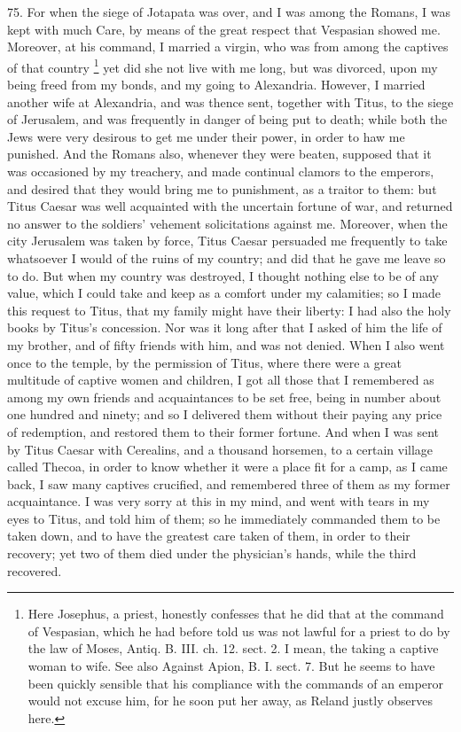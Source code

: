75. For when the siege of Jotapata was over, and I was among the Romans, I
was kept with much Care, by means of the great respect that Vespasian
showed me. Moreover, at his command, I married a virgin, who was from
among the captives of that country \footnote{Here Josephus, a priest,
honestly confesses that he did that at the command of Vespasian, which he
had before told us was not lawful for a priest to do by the law of Moses,
Antiq. B. III. ch. 12. sect. 2. I mean, the taking a captive woman to
wife. See also Against Apion, B. I. sect. 7. But he seems to have been
quickly sensible that his compliance with the commands of an emperor would
not excuse him, for he soon put her away, as Reland justly observes here.} yet did
she not live with me long, but was divorced, upon my being freed from my
bonds, and my going to Alexandria. However, I married another wife at
Alexandria, and was thence sent, together with Titus, to the siege of
Jerusalem, and was frequently in danger of being put to death; while both
the Jews were very desirous to get me under their power, in order to haw
me punished. And the Romans also, whenever they were beaten, supposed that
it was occasioned by my treachery, and made continual clamors to the
emperors, and desired that they would bring me to punishment, as a traitor
to them: but Titus Caesar was well acquainted with the uncertain fortune
of war, and returned no answer to the soldiers' vehement solicitations
against me. Moreover, when the city Jerusalem was taken by force, Titus
Caesar persuaded me frequently to take whatsoever I would of the ruins of
my country; and did that he gave me leave so to do. But when my country
was destroyed, I thought nothing else to be of any value, which I could
take and keep as a comfort under my calamities; so I made this request to
Titus, that my family might have their liberty: I had also the holy books
by Titus's concession. Nor was it long after that I asked of him the life
of my brother, and of fifty friends with him, and was not denied. When I
also went once to the temple, by the permission of Titus, where there were
a great multitude of captive women and children, I got all those that I
remembered as among my own friends and acquaintances to be set free, being
in number about one hundred and ninety; and so I delivered them without
their paying any price of redemption, and restored them to their former
fortune. And when I was sent by Titus Caesar with Cerealins, and a
thousand horsemen, to a certain village called Thecoa, in order to know
whether it were a place fit for a camp, as I came back, I saw many
captives crucified, and remembered three of them as my former
acquaintance. I was very sorry at this in my mind, and went with tears in
my eyes to Titus, and told him of them; so he immediately commanded them
to be taken down, and to have the greatest care taken of them, in order to
their recovery; yet two of them died under the physician's hands, while
the third recovered.

